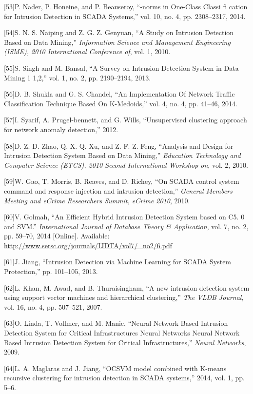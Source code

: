 \documentclass[11pt,]{article}
\begin{document}
{[}53{]}P. Nader, P. Honeine, and P. Beauseroy, ``-norms in One-Class
Classi fi cation for Intrusion Detection in SCADA Systems,'' vol. 10,
no. 4, pp. 2308--2317, 2014.

{[}54{]}S. N. S. Naiping and Z. G. Z. Genyuan, ``A Study on Intrusion
Detection Based on Data Mining,'' \emph{Information Science and
Management Engineering (ISME), 2010 International Conference of}, vol.
1, 2010.

{[}55{]}S. Singh and M. Bansal, ``A Survey on Intrusion Detection System
in Data Mining 1 1,2,'' vol. 1, no. 2, pp. 2190--2194, 2013.

{[}56{]}D. B. Shukla and G. S. Chandel, ``An Implementation Of Network
Traffic Classification Technique Based On K-Medoids,'' vol. 4, no. 4,
pp. 41--46, 2014.

{[}57{]}I. Syarif, A. Prugel-bennett, and G. Wills, ``Unsupervised
clustering approach for network anomaly detection,'' 2012.

{[}58{]}D. Z. D. Zhao, Q. X. Q. Xu, and Z. F. Z. Feng, ``Analysis and
Design for Intrusion Detection System Based on Data Mining,''
\emph{Education Technology and Computer Science (ETCS), 2010 Second
International Workshop on}, vol. 2, 2010.

{[}59{]}W. Gao, T. Morris, B. Reaves, and D. Richey, ``On SCADA control
system command and response injection and intrusion detection,''
\emph{General Members Meeting and eCrime Researchers Summit, eCrime
2010}, 2010.

{[}60{]}V. Golmah, ``An Efficient Hybrid Intrusion Detection System
based on C5. 0 and SVM.'' \emph{International Journal of Database Theory
\& Application}, vol. 7, no. 2, pp. 59--70, 2014 {[}Online{]}.
Available: \url{http://www.sersc.org/journals/IJDTA/vol7/_no2/6.pdf}

{[}61{]}J. Jiang, ``Intrusion Detection via Machine Learning for SCADA
System Protection,'' pp. 101--105, 2013.

{[}62{]}L. Khan, M. Awad, and B. Thuraisingham, ``A new intrusion
detection system using support vector machines and hierarchical
clustering,'' \emph{The VLDB Journal}, vol. 16, no. 4, pp. 507--521,
2007.

{[}63{]}O. Linda, T. Vollmer, and M. Manic, ``Neural Network Based
Intrusion Detection System for Critical Infrastructures Neural Networks
Neural Network Based Intrusion Detection System for Critical
Infrastructures,'' \emph{Neural Networks}, 2009.

{[}64{]}L. A. Maglaras and J. Jiang, ``OCSVM model combined with K-means
recursive clustering for intrusion detection in SCADA systems,'' 2014,
vol. 1, pp. 5--6.
\end{document}
